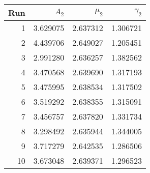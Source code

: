 \begin{tabular}{rrrr}
\toprule
 Run &     $A_2$ &   $\mu_2$ &  $\gamma_2$ \\
\midrule
   1 &  3.629075 &  2.637312 &    1.306721 \\
   2 &  4.439706 &  2.649027 &    1.205451 \\
   3 &  2.991280 &  2.636257 &    1.382562 \\
   4 &  3.470568 &  2.639690 &    1.317193 \\
   5 &  3.475995 &  2.638534 &    1.317502 \\
   6 &  3.519292 &  2.638355 &    1.315091 \\
   7 &  3.456757 &  2.637820 &    1.331734 \\
   8 &  3.298492 &  2.635944 &    1.344005 \\
   9 &  3.717279 &  2.642535 &    1.286506 \\
  10 &  3.673048 &  2.639371 &    1.296523 \\
\bottomrule
\end{tabular}
